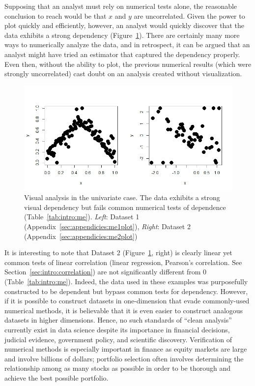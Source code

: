 Supposing that an analyst must rely on numerical tests alone, the reasonable
conclusion to reach would be that $x$ and $y$ are uncorrelated. Given the power
to plot quickly and efficiently, however, an analyst would quickly discover that
the data exhibits a strong dependency (Figure~\ref{fig:intro:meplot}). There are
certainly many more ways to numerically analyze the data, and in retrospect, it
can be argued that an analyst might have tried an estimator that captured the
dependency properly. Even then, without the ability to plot, the previous
numerical results (which were strongly uncorrelated) cast doubt on an analysis 
created without visualization.

\begin{figure}[htb]
	\begin{center}
		\includegraphics[width=1\linewidth]{ch-intro/figures/me}
		\caption[Visual analysis in the univariate case.]{Visual analysis in the
			univariate case. The data exhibits a strong visual dependency but 
			fails common
			numerical tests of dependence (Table~\ref{tab:intro:me}). 
			\textit{Left}: Dataset
			1 (Appendix~\ref{sec:appendicies:me1plot}), \textit{Right}: Dataset 
			2
			(Appendix~\ref{sec:appendicies:me2plot})}
		\label{fig:intro:meplot}
	\end{center}
\end{figure}

It is interesting to note that Dataset 2 (Figure~\ref{fig:intro:meplot}, right)
is clearly linear yet common tests of linear correlation (linear regression,
Pearson's correlation. See Section~\ref{sec:intro:correlation}) are not
significantly different from 0 (Table~\ref{tab:intro:me}). Indeed, the data used
in these examples was purposefully constructed to be dependent but bypass common
tests for dependency. However, if it is possible to construct datasets in
one-dimension that evade commonly-used numerical methods, it is believable that
it is even easier to construct analogous datasets in higher dimensions. Hence,
no such standards of ``clean analysis'' currently exist in data science despite
its importance in financial decisions, judicial evidence, government policy, and
scientific discovery. Verification of numerical methods is especially important
in finance as equity markets are large and involve billions of dollars;
portfolio selection often involves determining the relationship among as many
stocks as possible in order to be thorough and achieve the best possible
portfolio. 
